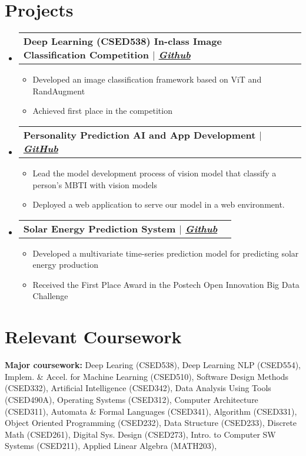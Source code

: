 \documentclass[letterpaper,11pt]{article}
\makeatletter
\newcommand{\resumeItem}[1]{
  \item\small{
    {#1 \vspace{-2pt}}
  }
}
\newcommand{\resumeProjectHeading}[1]{
  \vspace{-2pt}\item
    \begin{tabular*}{0.97\textwidth}[t]{l@{\extracolsep{\fill}}r}
      \textbf{#1} \\
    \end{tabular*}\vspace{-7pt}
}
\newcommand{\resumeSubHeadingListStart}{\begin{itemize}[leftmargin=0.15in, label={}]}
\newcommand{\resumeSubHeadingListEnd}{\end{itemize}}
\newcommand{\resumeItemListStart}{\begin{itemize}}
\newcommand{\resumeItemListEnd}{\end{itemize}\vspace{-5pt}}
\makeatother
\begin{document}

\section{Projects}
\vspace{3pt}
\resumeSubHeadingListStart

\resumeProjectHeading
{\textbf{Deep Learning (CSED538) In-class Image Classification Competition} $|$ \emph{\href{https://github.com/happyhappy-jun/CSED538-final-project}{Github}}}
\resumeItemListStart
\resumeItem{Developed an image classification framework based on ViT and RandAugment}
\resumeItem{Achieved first place in the competition}
\resumeItemListEnd

\resumeProjectHeading
{\textbf{Personality Prediction AI and App Development} $|$ \emph{\href{https://github.com/hhyy0401/UGRP}{GitHub}}}
\resumeItemListStart
\resumeItem{Lead the model development process of vision model that classify a person's MBTI with vision models}
\resumeItem{Deployed a web application to serve our model in a web environment.}
\resumeItemListEnd

\resumeProjectHeading
{\textbf{Solar Energy Prediction System} $|$ \emph{\href{https://github.com/happyhappy-jun/2020-Postech-Open-innovation-Bigdata-Challenge}{Github}}}
\resumeItemListStart
\resumeItem{Developed a multivariate time-series prediction model for predicting solar energy production}
\resumeItem{Received the First Place Award in the Postech Open Innovation Big Data Challenge}
\resumeItemListEnd
\resumeSubHeadingListEnd



\section{Relevant Coursework}
\vspace{3pt}
\resumeSubHeadingListStart
\small{\item{
	            \textbf{Major coursework:}{
		            Deep Learing (CSED538),
		            Deep Learning NLP (CSED554),
		            Implem. \& Accel. for Machine Learning (CSED510),
		            Software Design Methods (CSED332),
		            Artificial Intelligence (CSED342),
		            Data Analysis Using Tools (CSED490A),
		            Operating Systems (CSED312),
		            Computer Architecture (CSED311),
		            Automata \& Formal Languages (CSED341),
		            Algorithm (CSED331),
		            Object Oriented Programming (CSED232),
		            Data Structure (CSED233),
		            Discrete Math (CSED261),
		            Digital Sys. Design (CSED273),
		            Intro. to Computer SW Systems (CSED211),
		            Applied Linear Algebra (MATH203),
	            }
	      }}
\resumeSubHeadingListEnd
\end{document}
